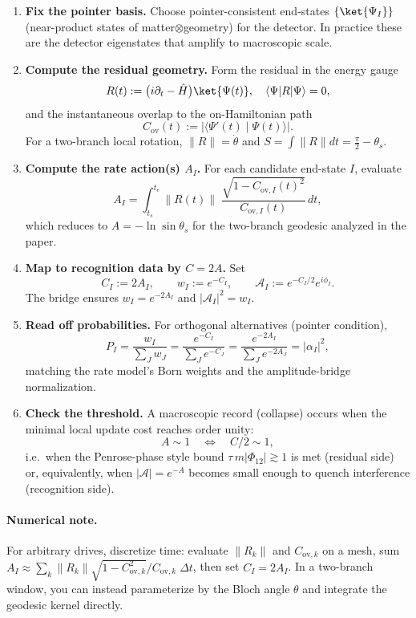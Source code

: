 \documentclass[11pt,letterpaper]{article}
\theoremstyle{definition}
\begin{document}
\begin{enumerate}
\item \textbf{Fix the pointer basis.}  
Choose pointer-consistent end-states \(\{\ket{\Psi_I}\}\) (near-product states of matter\(\otimes\)geometry) for the detector. In practice these are the detector eigenstates that amplify to macroscopic scale.
\item \textbf{Compute the residual geometry.}  
Form the residual in the energy gauge
\[
R(t):=\bigl(i\partial_t-\hat H\bigr)\ket{\Psi(t)},\quad \langle\Psi|R|\Psi\rangle=0,
\]
and the instantaneous overlap to the on-Hamiltonian path
\[
C_{\mathrm{ov}}(t):=\bigl|\langle\Psi'(t)\mid\Psi(t)\rangle\bigr|.
\]
For a two-branch local rotation, \(\|R\|=\dot\theta\) and \(S=\int\|R\|dt=\tfrac{\pi}{2}-\theta_s\).
\item \textbf{Compute the rate action(s) \(A_I\).}  
For each candidate end-state \(I\), evaluate
\[
A_I=\int_{t_s}^{t_e}\!\|R(t)\|\;\frac{\sqrt{1-C_{\mathrm{ov},I}(t)^2}}{C_{\mathrm{ov},I}(t)}\,dt,
\]
which reduces to \(A=-\ln\sin\theta_s\) for the two-branch geodesic analyzed in the paper.
\item \textbf{Map to recognition data by \(C=2A\).}  
Set
\[
C_I:=2A_I,\qquad
w_I:=e^{-C_I},\qquad
\mathcal A_I:=e^{-C_I/2}e^{i\phi_I}.
\]
The bridge ensures \(w_I=e^{-2A_I}\) and \(|\mathcal A_I|^2=w_I\).
\item \textbf{Read off probabilities.}  
For orthogonal alternatives (pointer condition),
\[
P_I=\frac{w_I}{\sum_J w_J}
=\frac{e^{-C_I}}{\sum_J e^{-C_J}}
=\frac{e^{-2A_I}}{\sum_J e^{-2A_J}}
=|\alpha_I|^2,
\]
matching the rate model’s Born weights and the amplitude-bridge normalization.
\item \textbf{Check the threshold.}  
A macroscopic record (collapse) occurs when the minimal local update cost reaches order unity:
\[
A\sim 1 \quad\Longleftrightarrow\quad C/2\sim 1,
\]
i.e.\ when the Penrose-phase style bound \(\tau\,m|\Phi_{12}|\gtrsim 1\) is met (residual side) or, equivalently, when \(|\mathcal A|=e^{-A}\) becomes small enough to quench interference (recognition side).\end{enumerate}

\paragraph{Numerical note.}
For arbitrary drives, discretize time: evaluate \(\|R_k\|\) and \(C_{\mathrm{ov},k}\) on a mesh, sum \(A_I\approx\sum_k \|R_k\|\sqrt{1-C_{\mathrm{ov},k}^2}/C_{\mathrm{ov},k}\;\Delta t\), then set \(C_I=2A_I\). In a two-branch window, you can instead parameterize by the Bloch angle \(\theta\) and integrate the geodesic kernel directly.
\end{document}
